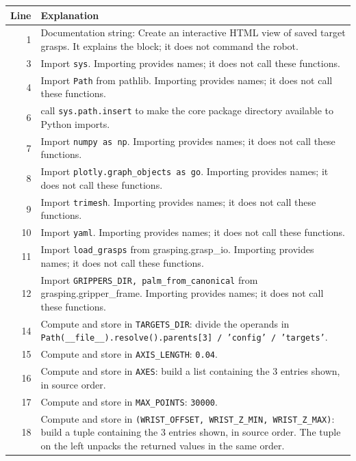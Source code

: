 \documentclass[11pt,a4paper]{book}
\begin{document}
\begin{longtable}{r p{}}

\textbf{Line} & \textbf{Explanation} \\ \hline \endhead

1 & Documentation string: Create an interactive HTML view of saved target grasps. It explains the block; it does not command the robot. \\

3 & Import \texttt{sys}. Importing provides names; it does not call these functions. \\

4 & Import \texttt{Path} from pathlib. Importing provides names; it does not call these functions. \\

6 & call \texttt{sys.path.insert} to make the core package directory available to Python imports. \\

7 & Import \texttt{numpy as np}. Importing provides names; it does not call these functions. \\

8 & Import \texttt{plotly.graph\_objects as go}. Importing provides names; it does not call these functions. \\

9 & Import \texttt{trimesh}. Importing provides names; it does not call these functions. \\

10 & Import \texttt{yaml}. Importing provides names; it does not call these functions. \\

11 & Import \texttt{load\_grasps} from grasping.grasp\_io. Importing provides names; it does not call these functions. \\

12 & Import \texttt{GRIPPERS\_DIR, palm\_from\_canonical} from grasping.gripper\_frame. Importing provides names; it does not call these functions. \\

14 & Compute and store in \texttt{TARGETS\_DIR}: divide the operands in \texttt{Path(\_\_file\_\_).resolve().parents[3] / 'config' / 'targets'}.  \\

15 & Compute and store in \texttt{AXIS\_LENGTH}: \texttt{0.04}.  \\

16 & Compute and store in \texttt{AXES}: build a list containing the 3 entries shown, in source order.  \\

17 & Compute and store in \texttt{MAX\_POINTS}: \texttt{30000}.  \\

18 & Compute and store in \texttt{(WRIST\_OFFSET, WRIST\_Z\_MIN, WRIST\_Z\_MAX)}: build a tuple containing the 3 entries shown, in source order. The tuple on the left unpacks the returned values in the same order. \\

\end{longtable}
\end{document}
